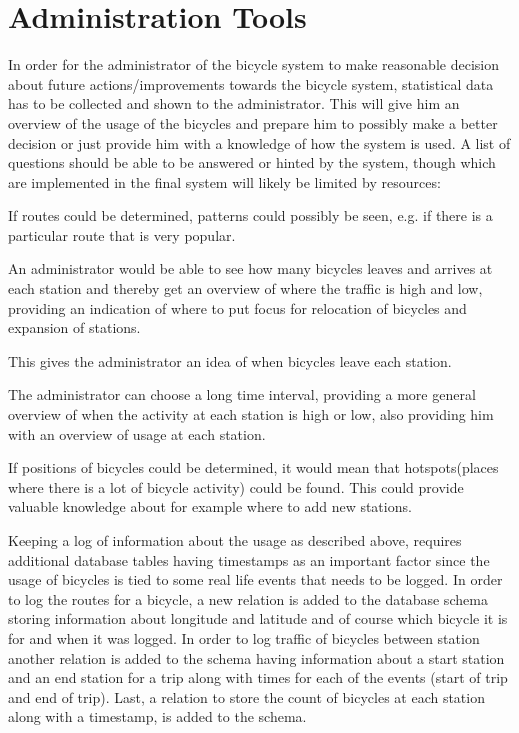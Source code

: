 \section{Administration Tools}\label{sec:designAdminTools}
In order for the administrator of the bicycle system to make reasonable decision about future actions/improvements towards the bicycle system, statistical data has to be collected and shown to the administrator. This will give him an overview of the usage of the bicycles and prepare him to possibly make a better decision or just provide him with a knowledge of how the system is used.
A list of questions should be able to be answered or hinted by the system, though which are implemented in the final system will likely be limited by resources:

\begin{description}[style=nextline]
\item[Which routes are used?] If routes could be determined, patterns could possibly be seen, e.g. if there is a particular route that is very popular.
\item[Where is the most traffic of bicycles during some period?] An administrator would be able to see how many bicycles leaves and arrives at each station and thereby get an overview of where the traffic is high and low, providing an indication of where to put focus for relocation of bicycles and expansion of stations.
\item[What is the current amount of bicycles at a given station?] This gives the administrator an idea of when bicycles leave each station.
\item[How does the amount of bicycles at a given station change over time?] The administrator can choose a long time interval, providing a more general overview of when the activity at each station is high or low, also providing him with an overview of usage at each station.
\item[Are there hotspots for bicycles?] If positions of bicycles could be determined, it would mean that hotspots(places where there is a lot of bicycle activity) could be found. 
This could provide valuable knowledge about for example where to add new stations.
\end{description}

Keeping a log of information about the usage as described above, requires additional database tables having timestamps as an important factor since the usage of bicycles is tied to some real life events that needs to be logged. 
In order to log the routes for a bicycle, a new relation is added to the database schema storing information about longitude and latitude and of course which bicycle it is for and when it was logged.
In order to log traffic of bicycles between station another relation is added to the schema having information about a start station and an end station for a trip along with times for each of the events (start of trip and end of trip).
Last, a relation to store the count of bicycles at each station along with a timestamp, is added to the schema.

